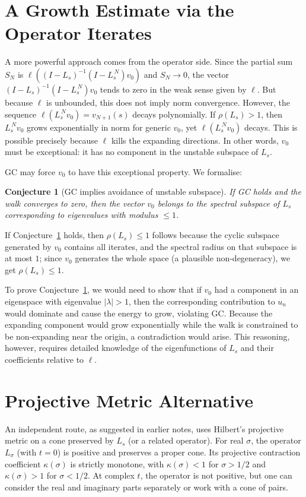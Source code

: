 \documentclass[11pt,a4paper]{article}
\newtheorem{conjecture}[theorem]{Conjecture}
\begin{document}
\section{A Growth Estimate via the Operator Iterates}
A more powerful approach comes from the operator side.  Since the partial sum \(S_{N}\) is \(\ell( (I - L_s)^{-1}(I - L_s^{\,N}) v_0 )\) and \(S_{N} \to 0\), the vector \((I - L_s)^{-1}(I - L_s^{\,N}) v_0\) tends to zero in the weak sense given by \(\ell\).  But because \(\ell\) is unbounded, this does not imply norm convergence.  However, the sequence \(\ell(L_s^{\,N} v_0) = v_{N+1}(s)\) decays polynomially.  If \(\rho(L_s) > 1\), then \(L_s^{\,N} v_0\) grows exponentially in norm for generic \(v_0\), yet \(\ell(L_s^{\,N} v_0)\) decays.  This is possible precisely because \(\ell\) kills the expanding directions.  In other words, \(v_0\) must be exceptional: it has no component in the unstable subspace of \(L_s\).

GC may force \(v_0\) to have this exceptional property.  We formalise:

\begin{conjecture}[GC implies avoidance of unstable subspace]\label{conj:unstable}
If GC holds and the walk converges to zero, then the vector \(v_0\) belongs to the spectral subspace of \(L_s\) corresponding to eigenvalues with modulus \(\le 1\).
\end{conjecture}

If Conjecture~\ref{conj:unstable} holds, then \(\rho(L_s) \le 1\) follows because the cyclic subspace generated by \(v_0\) contains all iterates, and the spectral radius on that subspace is at most \(1\); since \(v_0\) generates the whole space (a plausible non‑degeneracy), we get \(\rho(L_s) \le 1\).

To prove Conjecture~\ref{conj:unstable}, we would need to show that if \(v_0\) had a component in an eigenspace with eigenvalue \(|\lambda| > 1\), then the corresponding contribution to \(u_n\) would dominate and cause the energy to grow, violating GC.  Because the expanding component would grow exponentially while the walk is constrained to be non‑expanding near the origin, a contradiction would arise.  This reasoning, however, requires detailed knowledge of the eigenfunctions of \(L_s\) and their coefficients relative to \(\ell\).

\section{Projective Metric Alternative}
An independent route, as suggested in earlier notes, uses Hilbert's projective metric on a cone preserved by \(L_s\) (or a related operator).  For real \(\sigma\), the operator \(L_\sigma\) (with \(t=0\)) is positive and preserves a proper cone.  Its projective contraction coefficient \(\kappa(\sigma)\) is strictly monotone, with \(\kappa(\sigma) < 1\) for \(\sigma > 1/2\) and \(\kappa(\sigma) > 1\) for \(\sigma < 1/2\).  At complex \(t\), the operator is not positive, but one can consider the real and imaginary parts separately or work with a cone of pairs.
\end{document}
